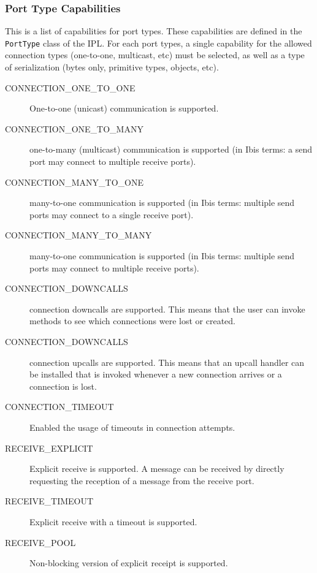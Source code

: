 \documentclass[10pt]{article}
\begin{document}
\subsubsection{Port Type Capabilities}

This is a list of capabilities for port types. These capabilities are
defined in the \texttt{PortType} class of the IPL.  For each port
types, a single capability for the allowed connection types (one-to-one,
multicast, etc) must be selected, as well as a type of
serialization (bytes only, primitive types, objects, etc). 

\begin{description}
\item[CONNECTION\_ONE\_TO\_ONE]
One-to-one (unicast) communication is supported.

\item[CONNECTION\_ONE\_TO\_MANY]
one-to-many (multicast) communication is supported
(in Ibis terms: a send port
may connect to multiple receive ports).

\item[CONNECTION\_MANY\_TO\_ONE]
many-to-one communication is supported (in Ibis terms: multiple
send ports may connect to a single receive port).

\item[CONNECTION\_MANY\_TO\_MANY]
many-to-one communication is supported (in Ibis terms: multiple
send ports may connect to multiple receive ports).

\item[CONNECTION\_DOWNCALLS]
connection downcalls are supported. This means that the user can
invoke methods to see which connections were lost or created.

\item[CONNECTION\_DOWNCALLS]
connection upcalls are supported. This means that an upcall handler can
be installed that is invoked whenever a new connection arrives or a
connection is lost.

\item[CONNECTION\_TIMEOUT]
Enabled the usage of timeouts in connection attempts.

\item[RECEIVE\_EXPLICIT]
Explicit receive is supported. A message can be received by directly
requesting the reception of a message from the receive port.

\item[RECEIVE\_TIMEOUT]
Explicit receive with a timeout is supported.

\item[RECEIVE\_POOL]
Non-blocking version of explicit receipt is supported.


\end{description}
\end{document}

